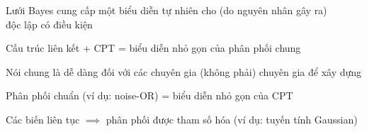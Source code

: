 \documentclass{article}
\begin{document}
\begin{huge}
\textwidth
{}


Lưới Bayes cung cấp một biểu diễn tự nhiên cho (do nguyên nhân gây ra)\\
độc lập có điều kiện

Cấu trúc liên kết + CPT = biểu diễn nhỏ gọn của phân phối chung

Nói chung là dễ dàng đối với các chuyên gia (không phải) chuyên gia để xây dựng

Phân phối chuẩn (ví dụ: noise-OR) = biểu diễn nhỏ gọn của CPT

Các biến liên tục $\implies$ phân phối được tham số hóa (ví dụ: tuyến tính
Gaussian)



\end{huge} 
\end{document}
